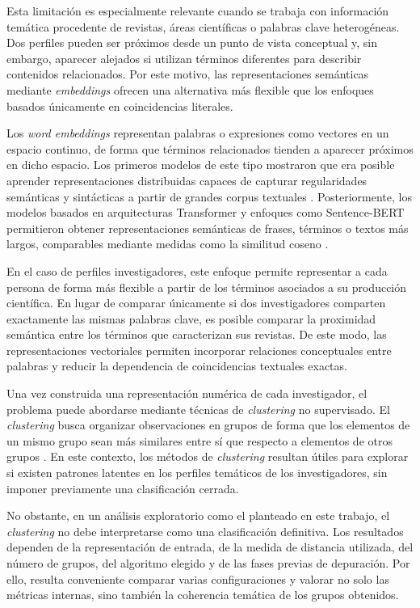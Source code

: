 \documentclass[11pt,spanish,listoffigures,listoftables]{tfgetsinf}
\begin{document}
Esta limitación es especialmente relevante cuando se trabaja con información temática procedente de revistas, áreas científicas o palabras clave heterogéneas. Dos perfiles pueden ser próximos desde un punto de vista conceptual y, sin embargo, aparecer alejados si utilizan términos diferentes para describir contenidos relacionados. Por este motivo, las representaciones semánticas mediante \textit{embeddings} ofrecen una alternativa más flexible que los enfoques basados únicamente en coincidencias literales.

Los \textit{word embeddings} representan palabras o expresiones como vectores en un espacio continuo, de forma que términos relacionados tienden a aparecer próximos en dicho espacio. Los primeros modelos de este tipo mostraron que era posible aprender representaciones distribuidas capaces de capturar regularidades semánticas y sintácticas a partir de grandes corpus textuales \cite{mikolov}. Posteriormente, los modelos basados en arquitecturas Transformer y enfoques como Sentence-BERT permitieron obtener representaciones semánticas de frases, términos o textos más largos, comparables mediante medidas como la similitud coseno \cite{sentencebert}.

En el caso de perfiles investigadores, este enfoque permite representar a cada persona de forma más flexible a partir de los términos asociados a su producción científica. En lugar de comparar únicamente si dos investigadores comparten exactamente las mismas palabras clave, es posible comparar la proximidad semántica entre los términos que caracterizan sus revistas. De este modo, las representaciones vectoriales permiten incorporar relaciones conceptuales entre palabras y reducir la dependencia de coincidencias textuales exactas.

Una vez construida una representación numérica de cada investigador, el problema puede abordarse mediante técnicas de \textit{clustering} no supervisado. El \textit{clustering} busca organizar observaciones en grupos de forma que los elementos de un mismo grupo sean más similares entre sí que respecto a elementos de otros grupos \cite{hastie}. En este contexto, los métodos de \textit{clustering} resultan útiles para explorar si existen patrones latentes en los perfiles temáticos de los investigadores, sin imponer previamente una clasificación cerrada.

No obstante, en un análisis exploratorio como el planteado en este trabajo, el \textit{clustering} no debe interpretarse como una clasificación definitiva. Los resultados dependen de la representación de entrada, de la medida de distancia utilizada, del número de grupos, del algoritmo elegido y de las fases previas de depuración. Por ello, resulta conveniente comparar varias configuraciones y valorar no solo las métricas internas, sino también la coherencia temática de los grupos obtenidos.
\end{document}
